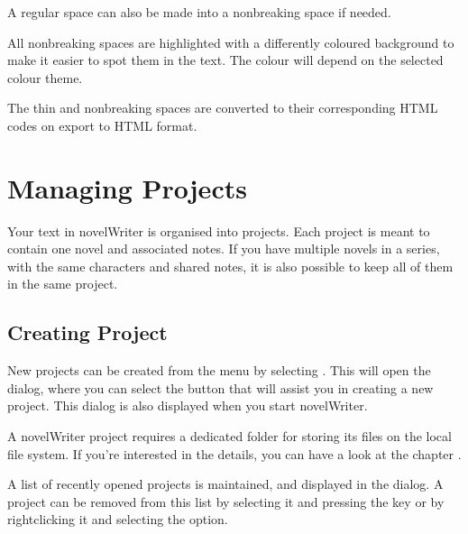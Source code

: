 \documentclass[a4paper,11pt,english]{sphinxmanual}
\begin{document}
\sphinxAtStartPar
A regular space can also be made into a non\sphinxhyphen{}breaking space if needed.

\sphinxAtStartPar
All non\sphinxhyphen{}breaking spaces are highlighted with a differently coloured background to make it easier to
spot them in the text. The colour will depend on the selected colour theme.

\sphinxAtStartPar
The thin and non\sphinxhyphen{}breaking spaces are converted to their corresponding HTML codes on export to HTML
format.

\sphinxstepscope


\chapter{Managing Projects}
\label{\detokenize{project_overview:managing-projects}}\label{\detokenize{project_overview:a-proj}}\label{\detokenize{project_overview::doc}}
\sphinxAtStartPar
Your text in novelWriter is organised into projects. Each project is meant to contain one novel
and associated notes. If you have multiple novels in a series, with the same characters and shared
notes, it is also possible to keep all of them in the same project.


\section{Creating Project}
\label{\detokenize{project_overview:creating-project}}\label{\detokenize{project_overview:a-proj-new}}
\sphinxAtStartPar
New projects can be created from the  menu by selecting . This
will open the  dialog, where you can select the  button that will assist
you in creating a new project. This dialog is also displayed when you start novelWriter.

\sphinxAtStartPar
A novelWriter project requires a dedicated folder for storing its files on the local file system.
If you’re interested in the details, you can have a look at the chapter {\hyperref[\detokenize{tech_storage:a-storage}]{}}.

\sphinxAtStartPar
A list of recently opened projects is maintained, and displayed in the  dialog. A
project can be removed from this list by selecting it and pressing the  key or by
right\sphinxhyphen{}clicking it and selecting the  option.
\end{document}
